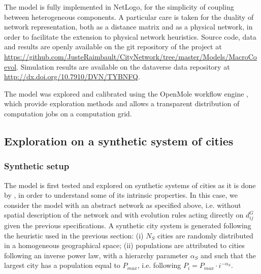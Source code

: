 
The model is fully implemented in NetLogo, for the simplicity of coupling between heterogeneous components. A particular care is taken for the duality of network representation, both as a distance matrix and as a physical network, in order to facilitate the extension to physical network heuristics. Source code, data and results are openly available on the git repository of the project at \url{https://github.com/JusteRaimbault/CityNetwork/tree/master/Models/MacroCoevol}. Simulation results are available on the dataverse data repository at \url{http://dx.doi.org/10.7910/DVN/TYBNFQ}.

The model was explored and calibrated using the OpenMole workflow engine \citep{reuillon2013openmole}, which provide exploration methods and allows a transparent distribution of computation jobs on a computation grid.



\subsection{Exploration on a synthetic system of cities}

\subsubsection{Synthetic setup}

The model is first tested and explored on synthetic systems of cities as it is done by \cite{favaro2011gibrat}, in order to understand some of its intrinsic properties. In this case, we consider the model with an abstract network as specified above, i.e. without spatial description of the network and with evolution rules acting directly on $d^G_{ij}$ given the previous specifications. A synthetic city system is generated following the heuristic used in the previous section: (i) $N_S$ cities are randomly distributed in a homogeneous geographical space; (ii) populations are attributed to cities following an inverse power law, with a hierarchy parameter $\alpha_S$ and such that the largest city has a population equal to $P_{max}$, i.e. following $P_i = P_{max} \cdot i^{-\alpha_S}$.



